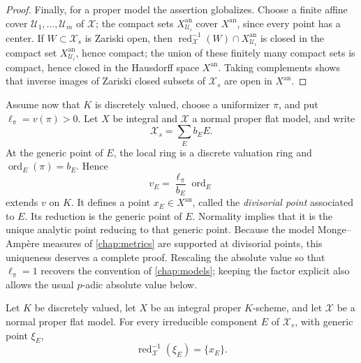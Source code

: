\begin{proof}
Finally, for a proper model the assertion globalizes.  Choose a finite
affine cover $\mathcal U_1,\ldots,\mathcal U_m$ of $\mathcal X$; the
compact sets $X^{\mathrm{an}}_{\mathcal U_i}$ cover
$X^{\mathrm{an}}$, since every point has a center.  If
$W\subset\mathcal X_s$ is Zariski open, then
$\operatorname{red}_{\mathcal X}^{-1}(W)\cap
X^{\mathrm{an}}_{\mathcal U_i}$ is closed in the compact set
$X^{\mathrm{an}}_{\mathcal U_i}$, hence compact; the union of these
finitely many compact sets is compact, hence closed in the Hausdorff
space $X^{\mathrm{an}}$.  Taking complements shows that inverse images
of Zariski closed subsets of $\mathcal X_s$ are open in
$X^{\mathrm{an}}$.
\end{proof}

Assume now that $K$ is discretely valued, choose a uniformizer $\pi$, and
put $\ell_\pi=v(\pi)>0$. Let $X$ be integral and $\mathcal X$ a normal
proper flat model, and write
\[
                        \mathcal X_s=\sum_E b_EE.
\]
At the generic point of $E$, the local ring is a discrete valuation ring
and $\operatorname{ord}_E(\pi)=b_E$. Hence
\[
                  v_E=\frac{\ell_\pi}{b_E}\operatorname{ord}_E
\]
extends $v$ on $K$. It defines a point $x_E\in X^{\mathrm{an}}$, called
the \emph{divisorial point} associated to $E$. Its reduction is the
generic point of $E$. Normality implies that it is the unique analytic
point reducing to that generic point.  Because the model Monge--Amp\`ere
measures of \cref{chap:metrics} are supported at divisorial points, this
uniqueness deserves a complete proof. Rescaling the absolute value so that
$\ell_\pi=1$ recovers the convention of \cref{chap:models}; keeping the
factor explicit also allows the usual $p$-adic absolute value below.

\begin{proposition}
\label{prop:berk-divisorial-fibre}
Let $K$ be discretely valued, let $X$ be an integral proper
$K$-scheme, and let $\mathcal X$ be a normal proper flat model.  For
every irreducible component $E$ of $\mathcal X_s$, with generic point
$\xi_E$,
\[
 \operatorname{red}_{\mathcal X}^{-1}(\xi_E)=\{x_E\}.
\]
\end{proposition}

